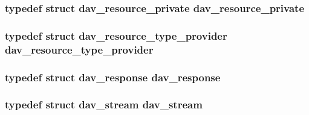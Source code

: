 \subsubsection[{\texorpdfstring{dav\+\_\+resource\+\_\+private}{dav_resource_private}}]{\setlength{\rightskip}{0pt plus 5cm}typedef struct {\bf dav\+\_\+resource\+\_\+private} {\bf dav\+\_\+resource\+\_\+private}}\hypertarget{group__MOD__DAV_ga42411ebc870b36ad29f4db65778aa6fe}{}\label{group__MOD__DAV_ga42411ebc870b36ad29f4db65778aa6fe}
\subsubsection[{\texorpdfstring{dav\+\_\+resource\+\_\+type\+\_\+provider}{dav_resource_type_provider}}]{\setlength{\rightskip}{0pt plus 5cm}typedef struct {\bf dav\+\_\+resource\+\_\+type\+\_\+provider}  {\bf dav\+\_\+resource\+\_\+type\+\_\+provider}}\hypertarget{group__MOD__DAV_ga51d12fbae5d67e214810ee44056ac114}{}\label{group__MOD__DAV_ga51d12fbae5d67e214810ee44056ac114}
\subsubsection[{\texorpdfstring{dav\+\_\+response}{dav_response}}]{\setlength{\rightskip}{0pt plus 5cm}typedef struct {\bf dav\+\_\+response} {\bf dav\+\_\+response}}\hypertarget{group__MOD__DAV_ga2cd181241bc818bff9c2640de1e823e1}{}\label{group__MOD__DAV_ga2cd181241bc818bff9c2640de1e823e1}
\subsubsection[{\texorpdfstring{dav\+\_\+stream}{dav_stream}}]{\setlength{\rightskip}{0pt plus 5cm}typedef struct {\bf dav\+\_\+stream} {\bf dav\+\_\+stream}}\hypertarget{group__MOD__DAV_ga74927be963f6a960133c4f25e33efebf}{}\label{group__MOD__DAV_ga74927be963f6a960133c4f25e33efebf}
